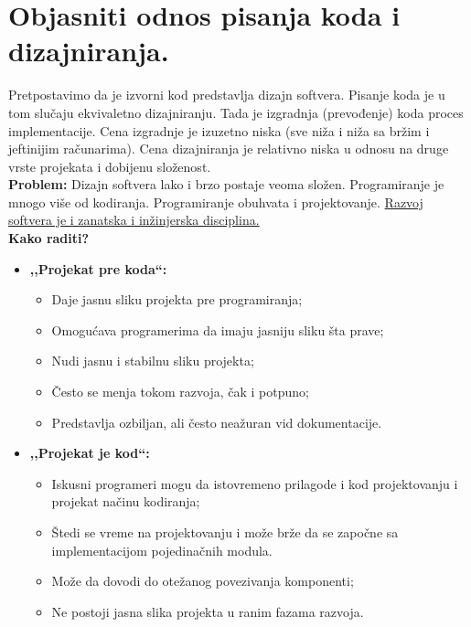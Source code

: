 \documentclass[a4paper]{article}
\begin{document}
\section{Objasniti odnos pisanja koda i dizajniranja.}
  Pretpostavimo da je izvorni kod predstavlja dizajn softvera. Pisanje koda je u tom slučaju
  ekvivaletno dizajniranju. Tada je izgradnja (prevođenje) koda
  proces implementacije. Cena izgradnje je izuzetno niska (sve niža i niža sa bržim i jeftinijim
  računarima). Cena dizajniranja je relativno niska u odnosu na druge vrste projekata i dobijenu
  složenost. \\
  \indent \textbf{Problem:} Dizajn softvera lako i brzo postaje veoma složen. Programiranje je mnogo više
  od kodiranja. Programiranje obuhvata i projektovanje. \underline{Razvoj softvera je i zanatska
  i inžinjerska disciplina.} \\
  \textbf{Kako raditi?}
  \begin{itemize}
    \item \textbf{,,Projekat pre koda``:}
          \begin{itemize}
            \item Daje jasnu sliku projekta pre programiranja;
            \item Omogućava programerima da imaju jasniju sliku šta prave;
            \item Nudi jasnu i stabilnu sliku projekta;
            \item Često se menja tokom razvoja, čak i potpuno;
            \item Predstavlja ozbiljan, ali često neažuran vid dokumentacije.
          \end{itemize}
    \item \textbf{,,Projekat je kod``:}
          \begin{itemize}
            \item Iskusni programeri mogu da istovremeno prilagode i kod projektovanju i 
                  projekat načinu kodiranja;
            \item Štedi se vreme na projektovanju i može brže da se započne sa implementacijom
                  pojedinačnih modula.
            \item Može da dovodi do otežanog povezivanja komponenti;
            \item Ne postoji jasna slika projekta u ranim fazama razvoja.
          \end{itemize}
  \end{itemize} 
\end{document}
